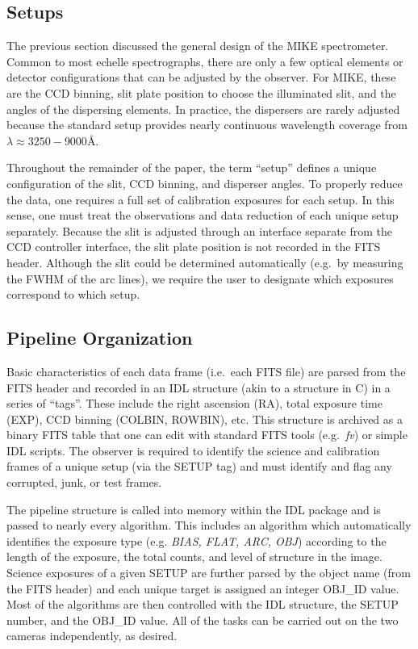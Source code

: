 \documentclass[]{emulateapj}
\begin{document}
\subsection{Setups}

The previous section discussed the general design of the
MIKE spectrometer.  Common to most echelle spectrographs,
there are only a few optical elements or detector configurations
that can be adjusted by the observer.  For MIKE, these are the
CCD binning, slit plate position to choose the illuminated slit, 
and the angles of the dispersing elements.
In practice, the dispersers are rarely adjusted
because the standard setup provides nearly continuous wavelength
coverage from $\lambda \approx 3250-9000$\AA.  

Throughout the remainder of the paper, the term ``setup'' defines
a unique configuration of the slit, CCD binning,
and disperser angles.  To properly reduce the data, one requires
a full set of calibration exposures for each setup.  
In this sense, one must treat the observations and data reduction of
each unique setup separately. 
Because the slit is adjusted through an interface separate from the CCD
controller interface, the slit plate position is not
recorded in the FITS header.  Although the slit could be
determined automatically (e.g.\ by measuring the FWHM of the arc lines),
we require the user to designate 
which exposures correspond to which setup.

\subsection{Pipeline Organization}
 
Basic characteristics of each data frame (i.e.\ each FITS file)
are parsed from the FITS header and recorded in an 
IDL structure (akin to a structure in C)
in a series of ``tags''.  These include the right ascension (RA),
total exposure time (EXP), CCD binning 
(COLBIN, ROWBIN), etc.  This structure is archived as a binary FITS table
that one can edit with standard FITS tools (e.g.\ {\it fv})
or simple IDL scripts.  The observer is required to identify the
science and calibration frames of a unique setup (via the SETUP tag)
and must identify and flag any corrupted, junk, or test frames.

The pipeline structure is called into memory within the IDL package
and is passed to nearly every algorithm. 
This includes an algorithm which automatically identifies the 
exposure type (e.g. {\it BIAS, FLAT, ARC, OBJ}) according to the
length of the exposure, the total counts, and
level of structure in the image.
Science exposures of a given SETUP
are further parsed by the object name (from the FITS header) and 
each unique target is assigned an integer OBJ\_ID value. 
Most of the algorithms are then controlled with the
IDL structure, the SETUP number, and the OBJ\_ID value.
All of the tasks can be carried out on the two cameras
independently, as desired.
\end{document}
